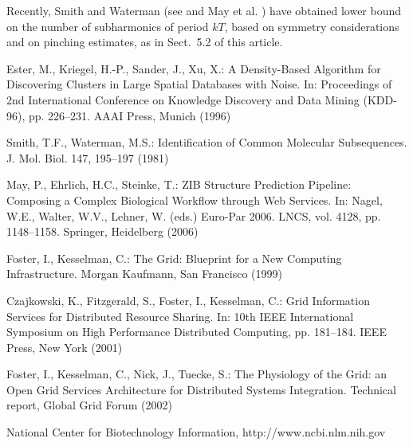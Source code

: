 \documentclass[lnicst,a4paper]{svmultln}
\begin{document}
Recently, Smith and Waterman (see \cite{smit:wat} and May et al. \cite{mes})
have obtained lower bound on the number of subharmonics of period $kT$,
based on symmetry considerations and on pinching estimates, as in
Sect.~5.2 of this article.





\begin{thebibliography}{5}

 Ester, M., Kriegel, H.-P., Sander, J., Xu, X.:
A Density-Based Algorithm for Discovering Clusters in Large Spatial Databases with Noise.
In: Proceedings of 2nd International Conference on Knowledge Discovery and Data Mining (KDD-96),
pp. 226--231. AAAI Press, Munich (1996)

 Smith, T.F., Waterman, M.S.: Identification of Common Molecular
Subsequences. J. Mol. Biol. 147, 195--197 (1981)

 May, P., Ehrlich, H.C., Steinke, T.: ZIB Structure Prediction Pipeline:
Composing a Complex Biological Workflow through Web Services. In: Nagel,
W.E., Walter, W.V., Lehner, W. (eds.) Euro-Par 2006. LNCS, vol. 4128,
pp. 1148--1158. Springer, Heidelberg (2006)

 Foster, I., Kesselman, C.: The Grid: Blueprint for a New Computing
Infrastructure. Morgan Kaufmann, San Francisco (1999)

 Czajkowski, K., Fitzgerald, S., Foster, I., Kesselman, C.: Grid
Information Services for Distributed Resource Sharing. In: 10th IEEE
International Symposium on High Performance Distributed Computing, pp.
181--184. IEEE Press, New York (2001)

 Foster, I., Kesselman, C., Nick, J., Tuecke, S.: The Physiology of the
Grid: an Open Grid Services Architecture for Distributed Systems
Integration. Technical report, Global Grid Forum (2002)

 National Center for Biotechnology Information, http://www.ncbi.nlm.nih.gov

\end{thebibliography}
\end{document}
